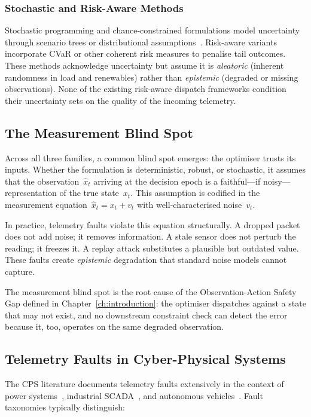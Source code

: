 \subsubsection{Stochastic and Risk-Aware Methods}

Stochastic programming and chance-constrained formulations model
uncertainty through scenario trees or distributional
assumptions~\cite{shapiro2021lectures}.  Risk-aware variants incorporate
CVaR or other coherent risk measures to penalise tail outcomes.  These
methods acknowledge uncertainty but assume it is \emph{aleatoric}
(inherent randomness in load and renewables) rather than \emph{epistemic}
(degraded or missing observations).  None of the existing risk-aware
dispatch frameworks condition their uncertainty sets on the quality of the
incoming telemetry.

\subsection{The Measurement Blind Spot}

Across all three families, a common blind spot emerges: the optimiser
trusts its inputs.  Whether the formulation is deterministic, robust, or
stochastic, it assumes that the observation~$\hat{x}_t$ arriving at the
decision epoch is a faithful---if noisy---representation of the true
state~$x_t$.  This assumption is codified in the measurement
equation~$\hat{x}_t = x_t + v_t$ with well-characterised noise~$v_t$.

In practice, telemetry faults violate this equation structurally.  A
dropped packet does not add noise; it removes information.  A stale
sensor does not perturb the reading; it freezes it.  A replay attack
substitutes a plausible but outdated value.  These faults create
\emph{epistemic} degradation that standard noise models cannot capture.

The measurement blind spot is the root cause of the Observation-Action
Safety Gap defined in Chapter~\ref{ch:introduction}: the optimiser
dispatches against a state that may not exist, and no downstream
constraint check can detect the error because it, too, operates on the
same degraded observation.

\subsection{Telemetry Faults in Cyber-Physical Systems}

The CPS literature documents telemetry faults extensively in the context
of power systems~\cite{liang2017review}, industrial
SCADA~\cite{cardenas2011attacks}, and autonomous
vehicles~\cite{sun2020adversarial}.  Fault taxonomies typically
distinguish:

